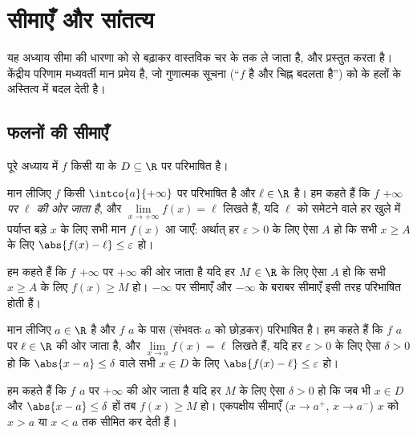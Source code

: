 \chapter{सीमाएँ और सांतत्य}\label{ch:g12:limcont}

यह अध्याय सीमा की धारणा को  से बढ़ाकर वास्तविक चर के  तक ले
जाता है, और  प्रस्तुत करता है। केंद्रीय परिणाम मध्यवर्ती मान प्रमेय
है, जो गुणात्मक सूचना (``$f$  है और चिह्न बदलता है'') को  के हलों
के अस्तित्व में बदल देती है।

\section{फलनों की सीमाएँ}

पूरे अध्याय में $f$ किसी  या  के  $D \subseteq \R$ पर परिभाषित 
है।

\begin{definition}[अनंत पर सीमा]\label{def:g12:limcont:liminf}
मान लीजिए $f$ किसी  $\intco{a}{+\infty}$ पर परिभाषित है और $\ell \in \R$ है। हम कहते हैं कि $f$
\emph{$+\infty$ पर $\ell$ की ओर जाता है}, और $\lim\limits_{x\to+\infty} f(x) = \ell$ लिखते हैं, यदि
$\ell$ को समेटने वाले हर खुले  में पर्याप्त बड़े $x$ के लिए सभी मान $f(x)$
आ जाएँ: अर्थात् हर $\varepsilon > 0$ के लिए ऐसा $A$ हो कि सभी $x \geq A$ के लिए $\abs{f(x) - \ell} \leq \varepsilon$ हो।

हम कहते हैं कि $f$ $+\infty$ पर $+\infty$ की ओर जाता है यदि हर $M \in \R$ के लिए ऐसा $A$
हो कि सभी $x \geq A$ के लिए $f(x) \geq M$ हो। $-\infty$ पर सीमाएँ और $-\infty$ के बराबर सीमाएँ इसी
तरह परिभाषित होती हैं।
\end{definition}

\begin{definition}[किसी बिंदु पर सीमा]\label{def:g12:limcont:limpoint}
मान लीजिए $a \in \R$ है और $f$ $a$ के पास (संभवतः $a$ को छोड़कर) परिभाषित है।
हम कहते हैं कि $f$ $a$ पर $\ell \in \R$ की ओर जाता है, और $\lim\limits_{x \to a} f(x) = \ell$ लिखते हैं, यदि हर
$\varepsilon > 0$ के लिए ऐसा $\delta > 0$ हो कि $\abs{x - a} \leq \delta$ वाले सभी $x \in D$ के लिए $\abs{f(x) - \ell} \leq \varepsilon$ हो।

हम कहते हैं कि $f$ $a$ पर $+\infty$ की ओर जाता है यदि हर $M$ के लिए ऐसा $\delta > 0$ हो
कि जब भी $x \in D$ और $\abs{x - a} \leq \delta$ हों तब $f(x) \geq M$ हो। एकपक्षीय सीमाएँ ($x \to a^+$, $x \to a^-$) $x$ को
$x > a$ या $x < a$ तक सीमित कर देती हैं।
\end{definition}

